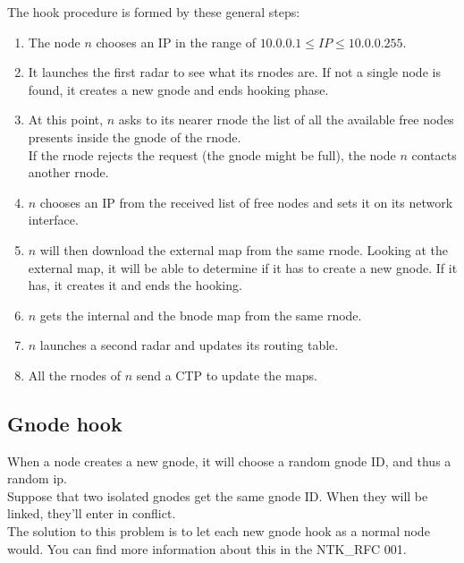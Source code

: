 \documentclass[a4paper]{article}
\begin{document}
The hook procedure is formed by these general steps:
\begin{enumerate}
	\item The node $n$ chooses an IP in the range of $10.0.0.1 \le IP \le
		10.0.0.255$.
	\item It launches the first radar to see what its rnodes are. If not a
		single node is found, it creates a new gnode and ends hooking
		phase.
	\item At this point, $n$ asks to its nearer rnode the list of all the
		available free nodes presents inside the gnode of the rnode.\\
		If the rnode rejects the request (the gnode might be full),
		the node $n$ contacts another rnode.
	\item $n$ chooses an IP from the received list of free nodes and sets
		it on its network interface.
	\item $n$ will then download the external map from the same rnode.
		Looking at the external map, it will be able to determine if
		it has to create a new gnode. If it has, it creates it and
		ends the hooking.
	\item $n$ gets the internal and the bnode map from the same rnode.
	\item $n$ launches a second radar and updates its routing table.
	\item All the rnodes of $n$ send a CTP to update the maps.
\end{enumerate}


\subsection{Gnode hook}
When a node creates a new gnode, it will choose a random gnode ID, and thus
a random ip.\\
Suppose that two isolated gnodes get the same gnode ID. When they will be
linked, they'll enter in conflict.\\
The solution to this problem is to let each new gnode hook as a normal node
would. You can find more information about this in the NTK\_RFC 001\cite{gnodecontiguity}.


%

\end{document}
